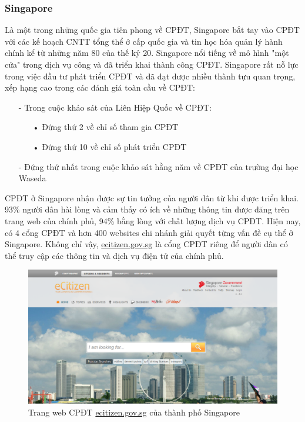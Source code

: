 \documentclass[a4paper]{article}
\begin{document}
\subsubsection{Singapore}
Là một trong những quốc gia tiên phong về CPĐT, Singapore bắt tay vào CPĐT với các kế hoạch CNTT tổng thể ở cấp quốc gia và tin học hóa quản lý hành chính kể từ những năm 80 của thế kỷ 20. Singapore nổi tiếng về mô hình "một cửa" trong dịch vụ công và đã triển khai thành công CPĐT. Singapore rất nỗ lực trong việc đầu tư phát triển CPĐT và đã đạt được nhiều thành tựu quan trọng, xếp hạng cao trong các đánh giá toàn cầu về CPĐT:
\begin{itemize}
	\item[-]Trong cuộc khảo sát của Liên Hiệp Quốc về CPĐT:
	\begin{itemize}
	\item[•]Đứng thứ 2 về chỉ số tham gia CPĐT
	\item[•]Đứng thứ 10 về chỉ số phát triển CPĐT
	\end{itemize}
	\item[-]Đứng thứ nhất trong cuộc khảo sát hằng năm về CPĐT của trường đại học Waseda
\end{itemize}
CPĐT ở Singapore nhận được sự tin tưởng của người dân từ khi được triển khai. 93\% người dân hài lòng và cảm thấy có ích về những thông tin được đăng trên trang web của chính phủ, 94\% bằng lòng với chất lượng dịch vụ CPĐT.
Hiện nay, có 4 cổng CPĐT và hơn 400 websites chi nhánh giải quyết từng vấn đề cụ thể ở Singapore. Không chỉ vậy, \href{https://www.ecitizen.gov.sg}{ecitizen.gov.sg} là cổng CPĐT riêng để người dân có thể truy cập các thông tin và dịch vụ điện tử của chính phủ.	
\begin{center}
    \begin{figure}[h]
    \begin{center}
     \includegraphics[scale=.3]{singapore.PNG}
    \end{center}
    \caption{Trang web CPĐT \href{ecitizen.gov.sg}{ecitizen.gov.sg} của thành phố Singapore}
    \label{refhinh2}
    \end{figure}
\end{center}
\end{document}
